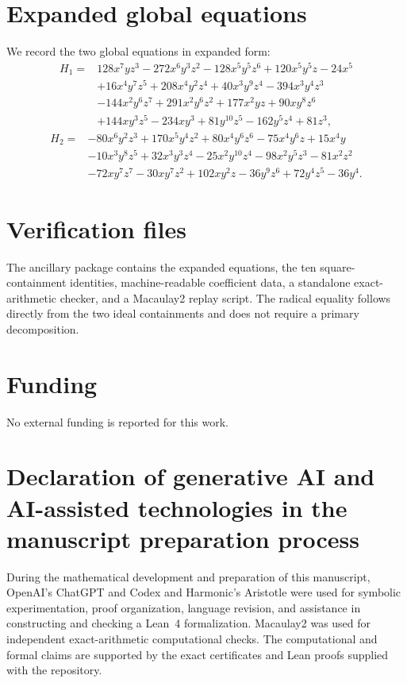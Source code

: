 \documentclass[11pt]{amsart}
\theoremstyle{remark}
\begin{document}
\section{Expanded global equations}\label{app:expanded}
We record the two global equations in expanded form:
\begin{align*}
H_1={}&128x^7yz^3-272x^6y^3z^2-128x^5y^5z^6+120x^5y^5z-24x^5\\
&+16x^4y^7z^5+208x^4y^2z^4+40x^3y^9z^4-394x^3y^4z^3\\
&-144x^2y^6z^7+291x^2y^6z^2+177x^2yz+90xy^8z^6\\
&+144xy^3z^5-234xy^3+81y^{10}z^5-162y^5z^4+81z^3,
\end{align*}
\begin{align*}
H_2={}&-80x^6y^2z^3+170x^5y^4z^2+80x^4y^6z^6-75x^4y^6z+15x^4y\\
&-10x^3y^8z^5+32x^3y^3z^4-25x^2y^{10}z^4-98x^2y^5z^3-81x^2z^2\\
&-72xy^7z^7-30xy^7z^2+102xy^2z-36y^9z^6+72y^4z^5-36y^4.
\end{align*}

\section{Verification files}
The ancillary package contains the expanded equations, the ten square-containment identities, machine-readable coefficient data, a standalone exact-arithmetic checker, and a Macaulay2 replay script.  The radical equality follows directly from the two ideal containments and does not require a primary decomposition.

\clearpage
\thispagestyle{plain}
\section*{Funding}
No external funding is reported for this work.

\section*{Declaration of generative AI and AI-assisted technologies in the manuscript preparation process}
During the mathematical development and preparation of this manuscript, OpenAI's ChatGPT and Codex and Harmonic's Aristotle were used for symbolic experimentation, proof organization, language revision, and assistance in constructing and checking a Lean~4 formalization.  Macaulay2 was used for independent exact-arithmetic computational checks.  The computational and formal claims are supported by the exact certificates and Lean proofs supplied with the repository.
\end{document}
